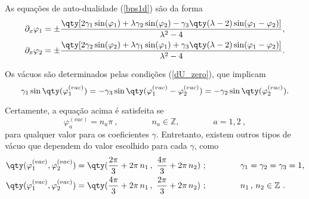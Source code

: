 As equações de auto-dualidade (\ref{bps1d}) são da forma
\begin{equation}
\begin{aligned}
    &\partial_x\varphi_1 = \pm \dfrac{\qty[2\gamma_1\sin(\varphi_1) + \lambda\gamma_2\sin(\varphi_2) - \gamma_3\qty(\lambda-2)\sin(\varphi_1-\varphi_2)]}{\lambda^2 - 4}, \\
    &\partial_x\varphi_2 = \pm \dfrac{\qty[2\gamma_2\sin(\varphi_2) + \lambda\gamma_1\sin(\varphi_1) + \gamma_3\qty(\lambda-2)\sin(\varphi_1-\varphi_2)]}{\lambda^2 - 4}.
\end{aligned}
\end{equation}

Os vácuos são determinados pelas condições (\ref{dU_zero}), que implicam
\begin{equation}
    \gamma_1\sin\qty(\varphi_1^{(vac)})=-\gamma_3\sin\qty(\varphi_1^{(vac)}-\varphi_2^{(vac)}) = - \gamma_2 \sin\qty(\varphi_2^{(vac)}).
\end{equation}

Certamente, a equação acima é satisfeita se
\begin{equation}
    \varphi_a^{(vac)} = n_a \pi \ , \qquad\qquad n_a \in \mathbb{Z}, \qquad\qquad a=1,2 \ ,
    \label{vac_normal}
\end{equation}
para qualquer valor para os coeficientes $\gamma$. Entretanto, existem outros tipos de vácuo que dependem do valor escolhido para cada $\gamma$, como 
\begin{equation}
\begin{aligned}
    & \qty(\varphi_1^{(vac)}, \varphi_2^{(vac)}) = \qty(\dfrac{2\pi}{3} + 2\pi \, n_1 \, , \ \dfrac{4\pi}{3} + 2\pi \, n_2) \ ; \qquad \qquad \gamma_1=\gamma_2=\gamma_3 = 1, \\
    & \qty(\varphi_1^{(vac)}, \varphi_2^{(vac)}) = \qty(\dfrac{4\pi}{3} + 2\pi \, n_1 \, , \ \dfrac{2\pi}{3} + 2\pi \, n_2) \ ; \qquad\qquad n_1 \, , \, n_2 \in \mathbb{Z} \ .
    \label{vac_especial}
\end{aligned}
\end{equation}


